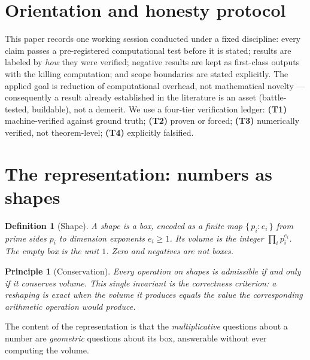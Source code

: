 \documentclass[11pt]{article}
\newtheorem{definition}{Definition}
\newtheorem{principle}{Principle}
\begin{document}
\section{Orientation and honesty protocol}

This paper records one working session conducted under a fixed discipline: every claim passes a
pre-registered computational test before it is stated; results are labeled by \emph{how} they were verified;
negative results are kept as first-class outputs with the killing computation; and scope boundaries are
stated explicitly. The applied goal is reduction of computational overhead, not mathematical novelty ---
consequently a result already established in the literature is an asset (battle-tested, buildable), not a
demerit. We use a four-tier verification ledger: \textbf{(T1)} machine-verified against ground truth;
\textbf{(T2)} proven or forced; \textbf{(T3)} numerically verified, not theorem-level; \textbf{(T4)}
explicitly falsified.

\section{The representation: numbers as shapes}

\begin{definition}[Shape]
A \emph{shape} is a box, encoded as a finite map $\{\,p_i : e_i\,\}$ from prime sides $p_i$ to dimension
exponents $e_i \ge 1$. Its \emph{volume} is the integer $\prod_i p_i^{e_i}$. The empty box is the unit $1$.
Zero and negatives are not boxes.
\end{definition}

\begin{principle}[Conservation]
Every operation on shapes is admissible if and only if it conserves volume. This single invariant is the
correctness criterion: a reshaping is exact when the volume it produces equals the value the corresponding
arithmetic operation would produce.
\end{principle}

The content of the representation is that the \emph{multiplicative} questions about a number are
\emph{geometric} questions about its box, answerable without ever computing the volume.
\end{document}
